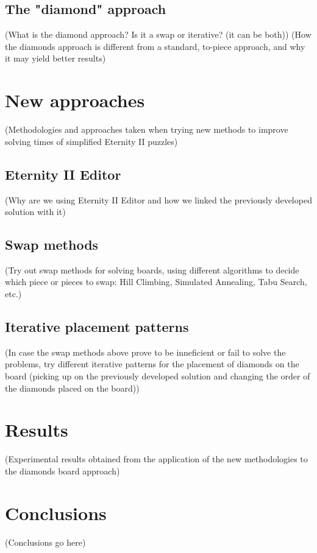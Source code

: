 \documentclass{llncs}
\begin{document}
\subsection{The "diamond" approach}

(What is the diamond approach? Is it a swap or iterative? (it can be both))
(How the diamonds approach is different from a standard, to-piece approach, and why it may yield better results)


\section{New approaches}

(Methodologies and approaches taken when trying new methods to improve solving times of simplified Eternity II puzzles)

\subsection{Eternity II Editor}

(Why are we using Eternity II Editor and how we linked the previously developed solution with it)

\subsection{Swap methods}

(Try out swap methods for solving boards, using different algorithms to decide which piece or pieces to swap: Hill Climbing, Simulated Annealing, Tabu Search, etc.)

\subsection{Iterative placement patterns}

(In case the swap methods above prove to be inneficient or fail to solve the problems, try different iterative patterns for the placement of diamonds on the board (picking up on the previously developed solution and changing the order of the diamonds placed on the board))

\section{Results}

(Experimental results obtained from the application of the new methodologies to the diamonds board approach)

\section{Conclusions}

(Conclusions go here)
%
%

\end{document}
